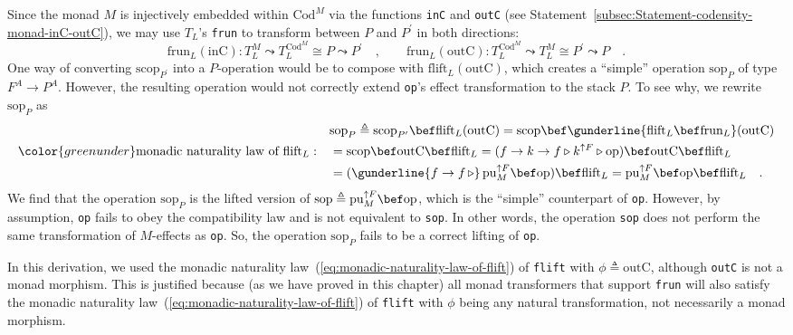 Since the monad $M$ is injectively embedded within $\text{Cod}^{M}$
via the functions \lstinline!inC! and \lstinline!outC! (see Statement~\ref{subsec:Statement-codensity-monad-inC-outC}),
we may use $T_{L}$\textsf{'}s \lstinline!frun! to transform between $P$
and $P^{\prime}$ in both directions:
\[
\text{frun}_{L}(\text{inC}):T_{L}^{M}\leadsto T_{L}^{\text{Cod}^{M}}\cong P\leadsto P^{\prime}\quad,\quad\quad\text{frun}_{L}(\text{outC}):T_{L}^{\text{Cod}^{M}}\leadsto T_{L}^{M}\cong P^{\prime}\leadsto P\quad.
\]
One way of converting $\text{scop}_{P^{\prime}}$ into a $P$-operation
would be to compose with $\text{flift}_{L}(\text{outC})$, which creates
a \textsf{``}simple\textsf{''} operation $\text{sop}_{P}$ of type $F^{A}\rightarrow P^{A}$.
However, the resulting operation would not correctly extend \lstinline!op!\textsf{'}s
effect transformation to the stack $P$. To see why, we rewrite $\text{sop}_{P}$
as
\begin{align*}
 & \text{sop}_{P}\triangleq\text{scop}_{P^{\prime}}\bef\text{flift}_{L}(\text{outC})=\text{scop}\bef\gunderline{\text{flift}_{L}\bef\text{frun}_{L}}(\text{outC})\\
{\color{greenunder}\text{monadic naturality law of }\text{flift}_{L}:}\quad & =\text{scop}\bef\text{outC}\bef\text{flift}_{L}=(f\rightarrow k\rightarrow f\triangleright k^{\uparrow F}\triangleright\text{op})\bef\text{outC}\bef\text{flift}_{L}\\
 & =(\gunderline{f\rightarrow f\,\triangleright}\,\text{pu}_{M}^{\uparrow F}\bef\text{op})\bef\text{flift}_{L}=\text{pu}_{M}^{\uparrow F}\bef\text{op}\bef\text{flift}_{L}\quad.
\end{align*}
We find that the operation $\text{sop}_{P}$ is the lifted version
of $\text{sop}\triangleq\text{pu}_{M}^{\uparrow F}\bef\text{op}$,
which is the \textsf{``}simple\textsf{''} counterpart of \lstinline!op!. However,
by assumption, \lstinline!op! fails to obey the compatibility law
and is not equivalent to \lstinline!sop!. In other words, the operation
\lstinline!sop! does not perform the same transformation of $M$-effects
as \lstinline!op!. So, the operation $\text{sop}_{P}$ fails to be
a correct lifting of \lstinline!op!.

In this derivation, we used the monadic naturality law~(\ref{eq:monadic-naturality-law-of-flift})
of \lstinline!flift! with $\phi\triangleq\text{outC}$, although
\lstinline!outC! is not a monad morphism. This is justified because
(as we have proved in this chapter) all monad transformers that support
\lstinline!frun! will also satisfy the monadic naturality law~(\ref{eq:monadic-naturality-law-of-flift})
of \lstinline!flift! with $\phi$ being any natural transformation,
not necessarily a monad morphism. 

